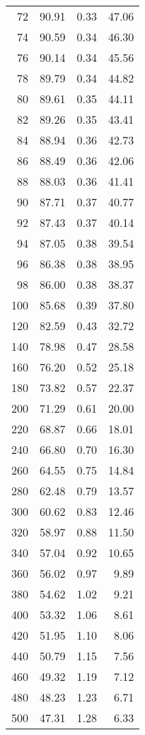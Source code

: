 \begin{table}[ht]
\begin{tabular}{rrrr}
     72 & 90.91 & 0.33 & 47.06 \\ 
     74 & 90.59 & 0.34 & 46.30 \\ 
     76 & 90.14 & 0.34 & 45.56 \\ 
     78 & 89.79 & 0.34 & 44.82 \\ 
     80 & 89.61 & 0.35 & 44.11 \\ 
     82 & 89.26 & 0.35 & 43.41 \\ 
     84 & 88.94 & 0.36 & 42.73 \\ 
     86 & 88.49 & 0.36 & 42.06 \\ 
     88 & 88.03 & 0.36 & 41.41 \\ 
     90 & 87.71 & 0.37 & 40.77 \\ 
     92 & 87.43 & 0.37 & 40.14 \\ 
     94 & 87.05 & 0.38 & 39.54 \\ 
     96 & 86.38 & 0.38 & 38.95 \\ 
     98 & 86.00 & 0.38 & 38.37 \\ 
    100 & 85.68 & 0.39 & 37.80 \\ 
    120 & 82.59 & 0.43 & 32.72 \\ 
    140 & 78.98 & 0.47 & 28.58 \\ 
    160 & 76.20 & 0.52 & 25.18 \\ 
    180 & 73.82 & 0.57 & 22.37 \\ 
    200 & 71.29 & 0.61 & 20.00 \\ 
    220 & 68.87 & 0.66 & 18.01 \\ 
    240 & 66.80 & 0.70 & 16.30 \\ 
    260 & 64.55 & 0.75 & 14.84 \\ 
    280 & 62.48 & 0.79 & 13.57 \\ 
    300 & 60.62 & 0.83 & 12.46 \\ 
    320 & 58.97 & 0.88 & 11.50 \\ 
    340 & 57.04 & 0.92 & 10.65 \\ 
    360 & 56.02 & 0.97 & 9.89 \\ 
    380 & 54.62 & 1.02 & 9.21 \\ 
    400 & 53.32 & 1.06 & 8.61 \\ 
    420 & 51.95 & 1.10 & 8.06 \\ 
    440 & 50.79 & 1.15 & 7.56 \\ 
    460 & 49.32 & 1.19 & 7.12 \\ 
    480 & 48.23 & 1.23 & 6.71 \\ 
    500 & 47.31 & 1.28 & 6.33 \\ 

\end{tabular}
\end{table}
